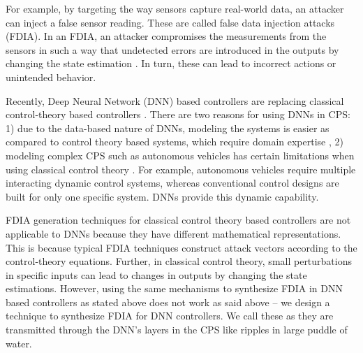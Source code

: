 For example, by targeting the way sensors capture real-world data, an attacker can inject a false sensor reading. These are called false data injection attacks (FDIA). In an FDIA, an attacker compromises the measurements from the sensors in such a way that undetected errors are introduced in the outputs by changing the state estimation \cite{7438916}. In turn, these can lead to incorrect actions or unintended behavior. 



Recently, Deep Neural Network (DNN) based controllers are replacing classical control-theory based controllers \cite{xiang18} \cite{Kocic2019} \cite{bechtel2017deeppicar}. There are two reasons for using DNNs in CPS: %
1) due to the data-based nature of DNNs, modeling the systems is easier as compared to control theory based systems, which require domain expertise \cite{Aamir_2013}, 2) modeling complex CPS such as autonomous vehicles has certain limitations when using classical control theory \cite{article23}. For example, autonomous vehicles require multiple interacting dynamic control systems, whereas conventional control designs are built for only one specific system. DNNs provide this dynamic capability.

FDIA generation techniques for classical control theory based controllers \cite{10.1145/1952982.1952995} are not applicable to DNNs because they have different mathematical representations. This is because typical FDIA techniques construct attack vectors according to the control-theory equations. %
Further, in classical control theory, small perturbations in specific inputs can lead to changes in outputs by changing the state estimations. %
However, using the same mechanisms to synthesize FDIA in DNN  based controllers as stated above does not work as said above %
-- we design a technique to synthesize FDIA for DNN controllers. We call these \attack as they are transmitted through the DNN's layers in the CPS like ripples in large puddle of water. %


